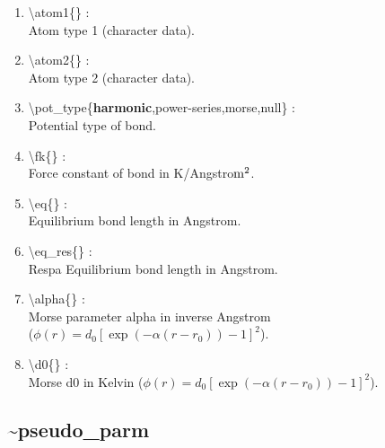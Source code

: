 \documentclass[12pt,titlepage]{article}
\begin{document}
\begin{enumerate}

 \vspace{0.15in} 
 \item  \textbackslash atom1\{\} : \\
    Atom type 1 (character data).
   
 \vspace{0.15in} 
 \item  \textbackslash atom2\{\} : \\ 
    Atom type 2 (character data).

 \vspace{0.15in} 
 \item  \textbackslash pot\_type\{{\bf harmonic},power-series,morse,null\} : \\
     Potential type of bond.

 \vspace{0.15in} 
 \item  \textbackslash fk\{\} : \\
     Force constant of bond in K/Angstro${\rm m}^2$.

 \vspace{0.15in} 
 \item  \textbackslash eq\{\} : \\
    Equilibrium bond length in Angstrom.

 \vspace{0.15in} 
 \item  \textbackslash eq\_res\{\} : \\
     Respa Equilibrium bond length in Angstrom.

 \vspace{0.15in} 
 \item  \textbackslash alpha\{\} : \\
    Morse parameter alpha in inverse Angstrom \\
    ($\phi(r) = d_0[\exp(-\alpha(r-r_0))-1]^2$).

 \vspace{0.15in} 
 \item  \textbackslash d0\{\} : \\
    Morse d0 in Kelvin
    ($\phi(r) = d_0[\exp(-\alpha(r-r_0))-1]^2$).

\end{enumerate}

\newpage
\subsection*{\bf \~{}pseudo\_parm}
\end{document}
